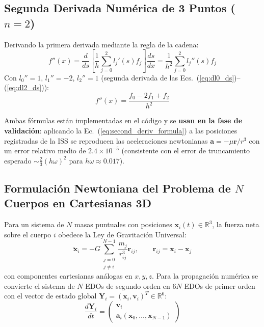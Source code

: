 \documentclass[11pt, a4paper]{article}
\begin{document}
\subsection{Segunda Derivada Numérica de 3 Puntos ($n=2$)}

Derivando la primera derivada mediante la regla de la cadena:
\begin{equation}
	f''(x) = \frac{d}{ds} \left[ \frac{1}{h} \sum_{j=0}^{2} l_j'(s) f_j \right] \frac{ds}{dx} = \frac{1}{h^2} \sum_{j=0}^{2} l_j''(s) f_j
\end{equation}
Con $l_0'' = 1$, $l_1'' = -2$, $l_2'' = 1$ (segunda derivada de las Ecs.~(\ref{eq:dl0_ds})--(\ref{eq:dl2_ds})):
\begin{equation}
	f''(x) = \frac{f_0 - 2f_1 + f_2}{h^2}
	\label{eq:second_deriv_formula}
\end{equation}

Ambas fórmulas están implementadas en el código y se \textbf{usan en la fase de validación}: aplicando la Ec.~(\ref{eq:second_deriv_formula}) a las posiciones registradas de la ISS se reproducen las aceleraciones newtonianas $\mathbf{a} = -\mu \mathbf{r}/r^3$ con un error relativo medio de $2.4\times10^{-5}$ (consistente con el error de truncamiento esperado $\sim \tfrac{2}{3}(h\omega)^2$ para $h\omega \approx 0.017$).

\subsection{Formulación Newtoniana del Problema de $N$ Cuerpos en Cartesianas 3D}

Para un sistema de $N$ masas puntuales con posiciones $\mathbf{x}_i(t) \in \mathbb{R}^3$, la fuerza neta sobre el cuerpo $i$ obedece la Ley de Gravitación Universal:
\begin{equation}
	\ddot{\mathbf{x}}_i = -G \sum_{\substack{j=0 \\ j \neq i}}^{N-1} \frac{m_j}{r_{ij}^3} \mathbf{r}_{ij}, \qquad \mathbf{r}_{ij} = \mathbf{x}_i - \mathbf{x}_j
	\label{eq:n_body_vector}
\end{equation}
con componentes cartesianas análogas en $x, y, z$. Para la propagación numérica se convierte el sistema de $N$ EDOs de segundo orden en $6N$ EDOs de primer orden con el vector de estado global $\mathbf{Y}_i = (\mathbf{x}_i, \mathbf{v}_i)^T \in \mathbb{R}^6$:
\begin{equation}
	\frac{d\mathbf{Y}_i}{dt} = \begin{pmatrix} \mathbf{v}_i \\ \mathbf{a}_i(\mathbf{x}_0, \dots, \mathbf{x}_{N-1}) \end{pmatrix}
	\label{eq:state_space_system}
\end{equation}
\end{document}
